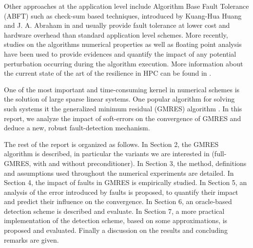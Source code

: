    Other approaches at the application level include Algorithm Base Fault Tolerance (ABFT) such as check-sum based techniques, introduced by Kuang-Hua Huang and J. A. Abraham in \cite{checksum} and usually provide fault tolerance at lower cost and hardware overhead than standard application level schemes. More recently, studies on the algorithms numerical properties as well as floating point analysis have been used to provide evidences and quantify the impact of any potential perturbation occurring during the algorithm execution. More information about the current state of the art of the resilience in HPC can be found in \cite{Cappello:2014:TER:2983586.2983587}.
   
   One of the most important and time-consuming kernel in numerical schemes is the solution of large sparse linear systems. One popular algorithm for solving such systems it the generalized minimum residual (GMRES) algorithm \cite{gmres}. 
   In this report, we analyze the impact of soft-errors on the convergence of GMRES and deduce a new, robust fault-detection mechanism.
   
   The rest of the report is organized as follows. In Section 2, the GMRES algorithm is described, in particular the variants we are interested in (full-GMRES, with and without preconditioner). In Section 3, the method, definitions and assumptions used throughout the numerical experiments are detailed. In Section 4, the impact of faults in GMRES is empirically studied. In Section 5, an analysis of the error introduced by faults is proposed, to quantify their impact and predict their influence on the convergence. In Section 6, an oracle-based detection scheme is described and evaluate. In Section 7, a more practical implementation of the detection scheme, based on some approximations, is proposed and evaluated. Finally a discussion on the results and concluding remarks are given.

